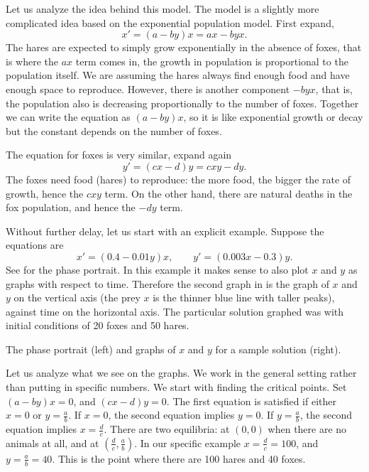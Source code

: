 \documentclass{ximera}
\begin{document}
Let us analyze the idea behind this model.  The model is a slightly more complicated idea based on the exponential population model. First expand,
\begin{equation*}
    x' = (a-by)x = ax - byx .
\end{equation*}
The hares are expected to simply grow exponentially in the absence of foxes, that is where the $ax$ term comes in, the growth in population is proportional to the population itself.  We are assuming the hares always find enough food and have enough space to reproduce.  However, there is another component $-byx$, that is, the population also is decreasing proportionally to the number of foxes.  Together we can write the equation as $(a-by)x$, so it is like exponential growth or decay but the constant depends on the number of foxes.

The equation for foxes is very similar, expand again
\begin{equation*}
    y' = (cx-d)y = cxy-dy .
\end{equation*}
The foxes need food (hares) to reproduce: the more food, the bigger the rate of growth, hence the $cxy$ term.  On the other hand, there are natural deaths in the fox population, and hence the $-dy$ term.

Without further delay, let us start with an explicit example.  Suppose the equations are 
\begin{equation*}
    x' = (0.4-0.01y)x, \qquad y' = (0.003x-0.3)y .
\end{equation*}
See  for the phase portrait.  In this example it makes sense to also plot $x$ and $y$ as graphs with respect to time. Therefore the second graph in  is the graph of $x$ and $y$ on the vertical axis (the prey $x$ is the thinner blue line with taller peaks), against time on the horizontal axis.  The particular solution graphed was with initial conditions of 20 foxes and 50 hares.
\begin{myfig}
    \capstart
    \caption{The phase portrait (left) and graphs of $x$ and $y$ for a sample solution (right). \label{fig:nlin-pred-prey}}
\end{myfig}

Let us analyze what we see on the graphs.  We work in the general setting rather than putting in specific numbers.  We start with finding the critical points.  Set $(a-by)x = 0$, and $(cx-d)y = 0$. The first equation is satisfied if either $x=0$ or $y=\frac{a}{b}$.  If $x=0$, the second equation implies $y=0$.  If $y= \frac{a}{b}$, the second equation implies $x=\frac{d}{c}$. There are two equilibria: at $(0,0)$ when there are no animals at all, and at $(\frac{d}{c},\frac{a}{b})$. In our specific example $x = \frac{d}{c} = 100$, and $y = \frac{a}{b} = 40$. This is the point where there are 100 hares and 40 foxes.
\end{document}

